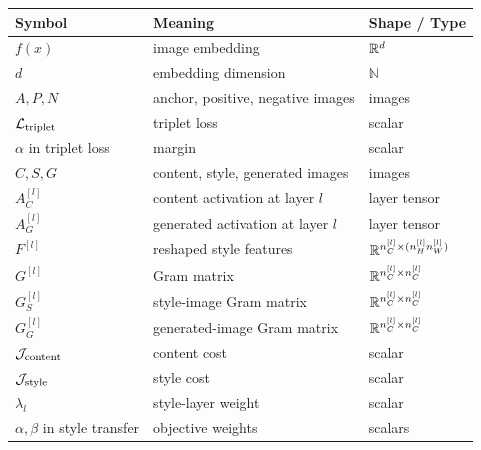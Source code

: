 \begin{center}
\begin{tabular}{lll}
\toprule
Symbol & Meaning & Shape / Type \\
\midrule
$f(x)$ & image embedding & $\mathbb{R}^d$ \\
$d$ & embedding dimension & $\mathbb{N}$ \\
$A,P,N$ & anchor, positive, negative images & images \\
$\mathcal{L}_{\mathrm{triplet}}$ & triplet loss & scalar \\
$\alpha$ in triplet loss & margin & scalar \\
$C,S,G$ & content, style, generated images & images \\
$A_C^{[l]}$ & content activation at layer $l$ & layer tensor \\
$A_G^{[l]}$ & generated activation at layer $l$ & layer tensor \\
$F^{[l]}$ & reshaped style features & $\mathbb{R}^{n_C^{[l]} \times (n_H^{[l]}n_W^{[l]})}$ \\
$G^{[l]}$ & Gram matrix & $\mathbb{R}^{n_C^{[l]} \times n_C^{[l]}}$ \\
$G_S^{[l]}$ & style-image Gram matrix & $\mathbb{R}^{n_C^{[l]} \times n_C^{[l]}}$ \\
$G_G^{[l]}$ & generated-image Gram matrix & $\mathbb{R}^{n_C^{[l]} \times n_C^{[l]}}$ \\
$\mathcal{J}_{\mathrm{content}}$ & content cost & scalar \\
$\mathcal{J}_{\mathrm{style}}$ & style cost & scalar \\
$\lambda_l$ & style-layer weight & scalar \\
$\alpha,\beta$ in style transfer & objective weights & scalars \\
\bottomrule
\end{tabular}
\end{center}
